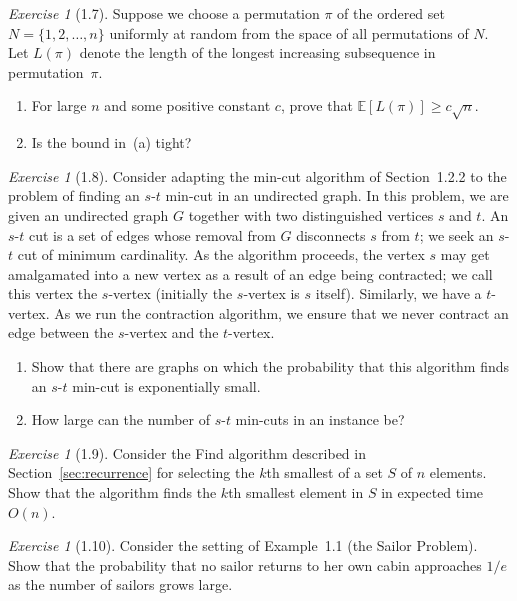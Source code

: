 \documentclass[twoside,12pt]{book}
\theoremstyle{plain}
\theoremstyle{definition}
\theoremstyle{remark}
\newtheorem{exercise}[theorem]{Exercise}
\begin{document}
\begin{exercise}[1.7]
Suppose we choose a permutation $\pi$ of the ordered set
$N=\{1,2,\ldots,n\}$ uniformly at random from the space of all permutations
of $N$.  Let $L(\pi)$ denote the length of the longest increasing
subsequence in permutation~$\pi$.
\begin{enumerate}[label=(\alph*)]
\item For large $n$ and some positive constant $c$, prove that
  $\mathbb{E}[L(\pi)]\ge c\sqrt{n}$.
\item Is the bound in~(a) tight?
\end{enumerate}
\end{exercise}

\begin{exercise}[1.8]
Consider adapting the min-cut algorithm of Section~1.2.2 to the
problem of finding an $s$-$t$ min-cut in an undirected graph.  In this
problem, we are given an undirected graph $G$ together with two distinguished
vertices $s$ and $t$.  An $s$-$t$ cut is a set of edges whose removal from
$G$ disconnects $s$ from $t$; we seek an $s$-$t$ cut of minimum cardinality.
As the algorithm proceeds, the vertex $s$ may get amalgamated into a new
vertex as a result of an edge being contracted; we call this vertex the
$s$-vertex (initially the $s$-vertex is $s$ itself).  Similarly, we have a
$t$-vertex.  As we run the contraction algorithm, we ensure that we never
contract an edge between the $s$-vertex and the $t$-vertex.
\begin{enumerate}[label=(\alph*)]
\item Show that there are graphs on which the probability that this algorithm
  finds an $s$-$t$ min-cut is exponentially small.
\item How large can the number of $s$-$t$ min-cuts in an instance be?
\end{enumerate}
\end{exercise}

\begin{exercise}[1.9]
Consider the Find algorithm described in Section~\ref{sec:recurrence} for
selecting the $k$th smallest of a set $S$ of $n$ elements.  Show that the
algorithm finds the $k$th smallest element in $S$ in expected time $O(n)$.
\end{exercise}

\begin{exercise}[1.10]
Consider the setting of Example~1.1 (the Sailor Problem).  Show that the
probability that no sailor returns to her own cabin approaches $1/e$ as the
number of sailors grows large.
\end{exercise}
\end{document}
